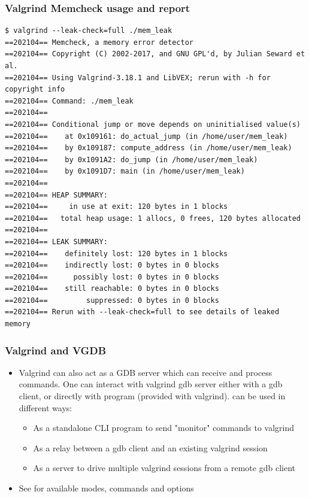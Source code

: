 \begin{frame}[fragile]
  \frametitle{Valgrind Memcheck usage and report}
  \begin{block}{}
    \begin{verbatim}
$ valgrind --leak-check=full ./mem_leak
==202104== Memcheck, a memory error detector
==202104== Copyright (C) 2002-2017, and GNU GPL'd, by Julian Seward et al.
==202104== Using Valgrind-3.18.1 and LibVEX; rerun with -h for copyright info
==202104== Command: ./mem_leak
==202104==
==202104== Conditional jump or move depends on uninitialised value(s)
==202104==    at 0x109161: do_actual_jump (in /home/user/mem_leak)
==202104==    by 0x109187: compute_address (in /home/user/mem_leak)
==202104==    by 0x1091A2: do_jump (in /home/user/mem_leak)
==202104==    by 0x1091D7: main (in /home/user/mem_leak)
==202104==
==202104== HEAP SUMMARY:
==202104==     in use at exit: 120 bytes in 1 blocks
==202104==   total heap usage: 1 allocs, 0 frees, 120 bytes allocated
==202104==
==202104== LEAK SUMMARY:
==202104==    definitely lost: 120 bytes in 1 blocks
==202104==    indirectly lost: 0 bytes in 0 blocks
==202104==      possibly lost: 0 bytes in 0 blocks
==202104==    still reachable: 0 bytes in 0 blocks
==202104==         suppressed: 0 bytes in 0 blocks
==202104== Rerun with --leak-check=full to see details of leaked memory
    \end{verbatim}
  \end{block}
\end{frame}


\begin{frame}[fragile]
  \frametitle{Valgrind and VGDB}
  \begin{itemize}
    \item Valgrind can also act as a GDB server which can receive and process
    commands. One can interact with valgrind gdb server either with a gdb
    client, or directly with  program (provided with valgrind).
     can be used in different ways:
    \begin{itemize}
      \item As a standalone CLI program to send "monitor" commands to valgrind
      \item As a relay between a gdb client and an existing valgrind session
      \item As a server to drive multiple valgrind sessions from a remote gdb
      client
    \end{itemize}
    \item See  for available modes, commands and options
    \end{itemize}
\end{frame}

